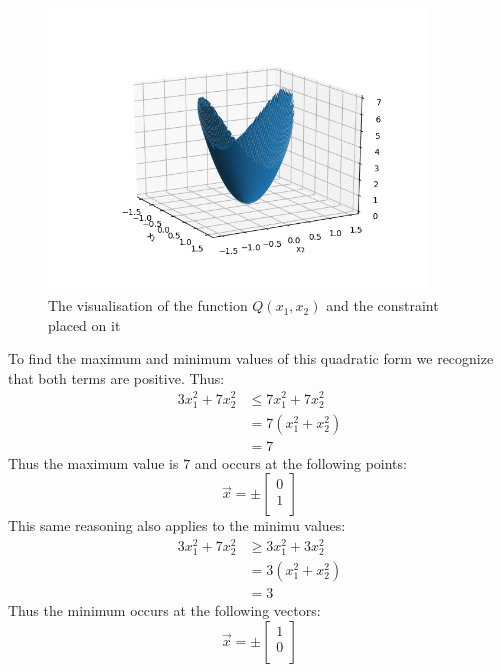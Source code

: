 \documentclass[11pt, a4paper]{article}
\begin{document}
\begin{figure}[h]
  \centerline{\includegraphics[width=100mm]{images/Figure_1.png}}
  \caption{The visualisation of the function $Q(x_1, x_2)$ and the constraint placed on it}
  \label{fig:optProb}
\end{figure}
To find the maximum and minimum values of this quadratic form we recognize that both terms are positive. Thus:
\begin{align*}
  3x_1^2 + 7x_2^2 &\leq 7x_1^2 + 7x_2^2\\
  &= 7(x_1^2 + x_2^2)\\
  &= 7
\end{align*}
Thus the maximum value is $7$ and occurs at the following points:
\begin{equation*}
  \vec{x} = \pm 
  \begin{bmatrix}
    0\\
    1\\
  \end{bmatrix}
\end{equation*}
This same reasoning also applies to the minimu values:
\begin{align*}
  3x_1^2 + 7x_2^2 &\geq 3x_1^2 + 3x_2^2\\
  &= 3(x_1^2 + x_2^2)\\
  &= 3
\end{align*}
Thus the minimum occurs at the following vectors:
\begin{equation*}
  \vec{x} = \pm 
  \begin{bmatrix}
    1\\
    0\\
  \end{bmatrix}
\end{equation*}
\end{document}
